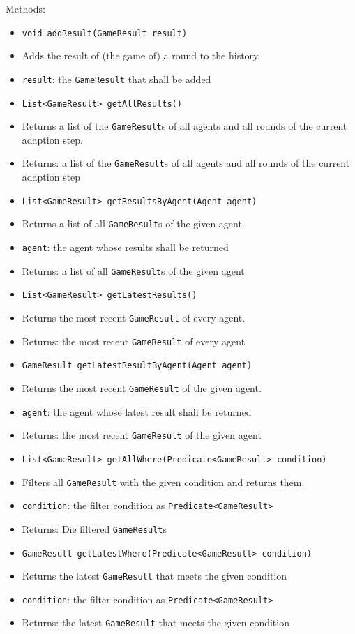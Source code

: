 \documentclass[parskip=full,11pt]{scrartcl}
\begin{document}
Methods:
\begin{itemize}\itemsep -10pt
	\item \texttt{void addResult(GameResult result)}
	\item[] Adds the result of (the game of) a round to the history.
	\item[] \texttt{result}: the \texttt{GameResult} that shall be added
	\item \texttt{List<GameResult> getAllResults()}
	\item[] Returns a list of the \texttt{GameResult}s of all agents and all rounds of the current adaption step.
	\item[]Returns: a list of the \texttt{GameResult}s of all agents and all rounds of the current adaption step
	\item \texttt{List<GameResult> getResultsByAgent(Agent agent)}
	\item[] Returns a list of all \texttt{GameResult}s of the given agent.
	\item[] \texttt{agent}: the agent whose results shall be returned
	\item[]Returns: a list of all \texttt{GameResult}s of the given agent
	\item \texttt{List<GameResult> getLatestResults()}
	\item[] Returns the most recent \texttt{GameResult} of every agent.
	\item[]Returns: the most recent \texttt{GameResult} of every agent
	\item \texttt{GameResult getLatestResultByAgent(Agent agent)}
	\item[] Returns the most recent \texttt{GameResult} of the given agent.
	\item[] \texttt{agent}: the agent whose latest result shall be returned
	\item[]Returns: the most recent \texttt{GameResult} of the given agent
	\item \texttt{List<GameResult> getAllWhere(Predicate<GameResult> condition)}
	\item[] Filters all \texttt{GameResult} with the given condition and returns them.
	\item[]\texttt{condition}: the filter condition as \texttt{Predicate<GameResult>}
	\item[]Returns: Die filtered \texttt{GameResult}s
	\item \texttt{GameResult getLatestWhere(Predicate<GameResult> condition)}
	\item[] Returns the latest \texttt{GameResult} that meets the given condition
	\item[]\texttt{condition}: the filter condition as \texttt{Predicate<GameResult>}
	\item[]Returns: the latest \texttt{GameResult} that meets the given condition
\end{itemize}
\end{document}
